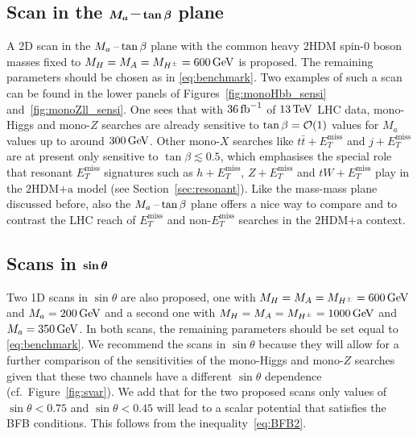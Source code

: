 \documentclass[a4paper, 11pt,notoc]{article}
\newcommand{\MET}{\ensuremath{E_T^\mathrm{miss}}\xspace}
\newcommand{\mA}{\ensuremath{M_{A}}\xspace}
\newcommand{\ma}{\ensuremath{M_{a}}\xspace}
\newcommand{\mH}{\ensuremath{M_{H}}\xspace}
\newcommand{\mHc}{\ensuremath{M_{H^{\pm}}}\xspace}
\newcommand{\hdma}{\ensuremath{\textrm{2HDM+a}}\xspace}
\def\bm#1{\mbox{\boldmath$#1$\unboldmath}}
\begin{document}
\subsection*{Scan in the $\bm{\ma}\hspace{0.5mm}$--$\hspace{0.5mm} \bm{\tan \beta}$ plane}

A 2D scan in the  $\ma\hspace{0.5mm}$--$\hspace{0.5mm} \tan \beta$ plane with  the common heavy 2HDM  {\color{red} spin-0 boson}  masses fixed to $\mH = \mA = \mHc = 600 \, {\rm GeV}$ is proposed.  The remaining parameters should be chosen as in \eqref{eq:benchmark}. {\color{blue} Two examples of such a scan can be found in the lower panels of Figures~\ref{fig:monoHbb_sensi} and~\ref{fig:monoZll_sensi}. One sees that with $36 \, {\rm fb}^{-1}$ of $13 \, {\rm TeV}$ LHC data, mono-Higgs and mono-$Z$ searches are already sensitive to $\tan \beta = {\cal O} (1)$ values for $M_a$ values up to around $300 \, {\rm GeV}$.} Other mono-$X$ searches like $t \bar t +\MET$ and $j + \MET$ are at present only sensitive to $\tan \beta \lesssim 0.5$, which emphasises the special role that  resonant $\MET$ signatures such as $h + \MET$, $Z + \MET$ and $tW + \MET$ play in the \hdma model (see Section~\ref{sec:resonant}). Like  the mass-mass plane discussed before, also the $\ma\hspace{0.5mm}$--$\hspace{0.5mm} \tan \beta$ plane offers a nice way to compare and to contrast the LHC reach of $\MET$ and non-$\MET$ searches in the \hdma context. 

\subsection*{Scans in $\bm{\sin \theta}$}

Two 1D  scans in $\sin \theta$ are also proposed, one with $\mH = \mA = \mHc = 600 \, {\rm GeV}$ and $\ma = 200 \, {\rm GeV}$ and a second one with $\mH = \mA = \mHc = 1000 \, {\rm GeV}$ and $\ma = 350 \, {\rm GeV}$. In both scans, the remaining parameters should be set equal to \eqref{eq:benchmark}.  {\color{red} We recommend the scans in $\sin \theta$ because they will  allow for a further comparison of the sensitivities of the mono-Higgs and mono-$Z$ searches given that these two channels have a different $\sin \theta$ dependence (cf.~Figure~\ref{fig:svar}).}  We add that for the two proposed scans only values of $\sin \theta < 0.75$ and $\sin \theta < 0.45$ will lead to a scalar potential that satisfies the BFB conditions. This follows from the inequality~\eqref{eq:BFB2}.
\end{document}
